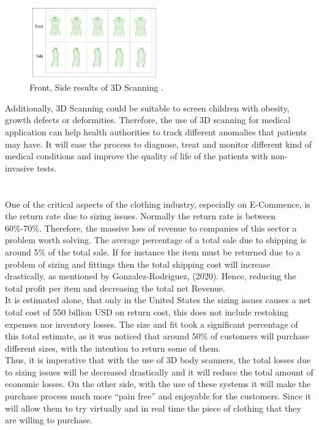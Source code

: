 \documentclass[a4paper]{article}
\begin{document}
\begin{figure}[h]
    \begin{center}
    \includegraphics[width=0.5\textwidth]{bodyMedicine.png}
    \caption{Front, Side results of 3D Scanning \cite[]{treleaven_wells_2007}.}
    \label{bodymed}
\end{center}
\end{figure}
Additionally, 3D Scanning could be suitable to screen children with obesity, growth defects or deformities.
Therefore, the use of 3D scanning for medical application can help health authorities to track different anomalies that patients may have.
It will ease the process to diagnose, treat and monitor different kind of medical conditions and improve the quality of life of the patients with non-invasive tests. \\[12pt] 
\enlargethispage{\baselineskip}


\section*{}
One of the critical aspects of the clothing industry, especially on E-Commence, is the return rate due to sizing issues. Normally the return rate is between 60\%-70\%.
Therefore, the massive loss of revenue to companies of this sector a problem worth solving. 
The average percentage of a total sale due to shipping is around 5\% of the total sale. 
If for instance the item must be returned due to a problem of sizing and fittings then the total shipping cost will increase drastically, as mentioned by Gonzalez-Rodriguez, (2020). 
Hence, reducing the total profit per item and decreasing the total net Revenue.\\[10pt]
It is estimated alone, that only in the United States the sizing issues causes a net total cost of 550 billion USD on return cost, this does not include restoking expenses nor inventory losses.
The size and fit took a significant percentage of this total estimate, as it was noticed that around 50\% of customers will purchase different sizes, with the intention to return some of them.\\[10pt]
Thus, it is imperative that with the use of 3D body scanners, the total losses due to sizing issues will be decreased drastically and it will reduce the total amount of economic losses.
On the other side, with the use of these systems it will make the purchase process much more “pain free” and enjoyable for the customers. Since it will allow them to try virtually and in real time the piece of clothing that they are willing to purchase.
\end{document}
